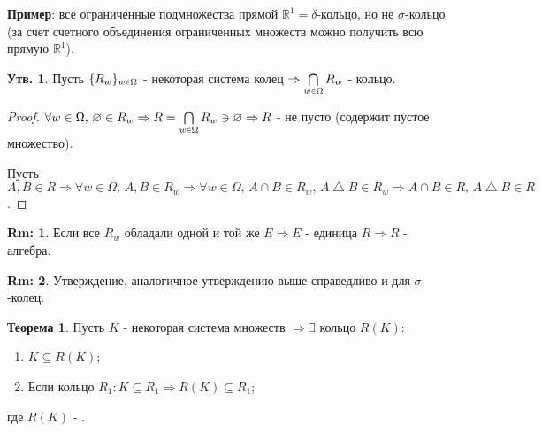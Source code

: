 \documentclass[12pt]{article}
\newcommand{\MR}{\mathbb{R}}
\theoremstyle{definition}
\newtheorem{rem}{Rm:}
\newtheorem{prop}{Утв.}
\newtheorem{theorem}{Теорема}
\newcommand{\smallerrel}[1]{\mathrel{\mathpalette\smallerrelaux{#1}}}
\newcommand{\smallerrelaux}[2]{\raisebox{.1ex}{\scalebox{.75}{$#1#2$}}}
\newcommand{\smallin}{\smallerrel{\in}}
\begin{document}
\textbf{Пример}: все ограниченные подмножества прямой $\mathbb{R}^1 = \delta$-кольцо, но не $\sigma$-кольцо (за счет счетного объединения ограниченных множеств можно получить всю прямую $\MR^1$).

\begin{prop}
	Пусть $\{R_w\}_{w \smallin \Omega}$ - некоторая система колец $\Rightarrow \bigcap\limits_{w \smallin \Omega} R_w$ - кольцо.
\end{prop}

\begin{proof}
	$\forall w \in \Omega, \, \varnothing \in R_w \Rightarrow R = \bigcap\limits_{w \smallin \Omega} R_w \ni \varnothing \Rightarrow R$ - не пусто (содержит пустое множество). 
	
	Пусть $A, B \in R \Rightarrow \forall w \in \Omega, \, A, B \in R_w \Rightarrow \forall w \in \Omega, \, A \cap B \in R_w, \, A \bigtriangleup B \in R_w \Rightarrow A \cap B \in R, \, A \bigtriangleup B \in R$.
\end{proof}

\begin{rem}
	Если все $R_w$ обладали одной и той же $E \Rightarrow E$ - единица $R \Rightarrow R$ - алгебра.
\end{rem}

\begin{rem}
	Утверждение, аналогичное утверждению выше справедливо и для $\sigma$-колец.
\end{rem}

\begin{theorem}
	Пусть $K$ - некоторая система множеств $\Rightarrow \exists$ кольцо $R(K)$:
	\begin{enumerate}[label={(\arabic*)}]
		\item $K \subseteq R(K)$;
		\item Если кольцо $R_1 \colon K \subseteq R_1 \Rightarrow R(K) \subseteq R_1$;
	\end{enumerate}
	где $R(K)$ - .
\end{theorem}
\end{document}
